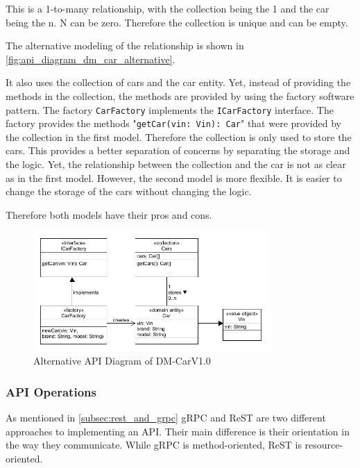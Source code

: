 This is a 1-to-many relationship, with the collection being the 1 and the car being the n.
N can be zero.
Therefore the collection is unique and can be empty.

The alternative modeling of the relationship is shown in \autoref{fig:api_diagram_dm_car_alternative}.

It also uses the collection of cars and the car entity.
Yet, instead of providing the methods in the collection, the methods are provided by using the factory software pattern.
The factory \texttt{CarFactory} implements the \texttt{ICarFactory} interface.
The factory provides the methods "\texttt{getCar(vin: Vin): Car}" that were provided by the collection in the first model.
Therefore the collection is only used to store the cars.
This provides a better separation of concerns by separating the storage and the logic.
Yet, the relationship between the collection and the car is not as clear as in the first model.
However, the second model is more flexible.
It is easier to change the storage of the cars without changing the logic.

Therefore both models have their pros and cons.

\begin{figure}[H]
    \centering
    \includegraphics[width=0.8\textwidth]{figures/microservices/dmCar/apiDiagramDM-CarExtended.png}
    \caption{Alternative API Diagram of DM-CarV1.0}
    \label{fig:api_diagram_dm_car_alternative}
\end{figure}

\subsubsection*{API Operations}
As mentioned in \autoref{subsec:rest_and_grpc} gRPC and ReST are two different approaches to implementing an API.
Their main difference is their orientation in the way they communicate.
While gRPC is method-oriented, ReST is resource-oriented.

